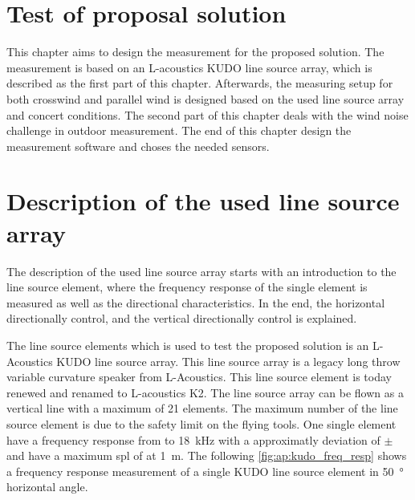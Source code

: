 \section{Test of proposal solution}
This chapter aims to design the measurement for the proposed solution. The measurement is based on an L-acoustics KUDO line source array, which is described as the first part of this chapter. Afterwards, the measuring setup for both crosswind and parallel wind is designed based on the used line source array and concert conditions. The second part of this chapter deals with the wind noise challenge in outdoor measurement. The end of this chapter design the measurement software and choses the needed sensors. 



\section{Description of the used line source array}\label{sec:prop:des_of_lin}

The description of the used line source array starts with an introduction to the line source element, where the frequency response of the single element is measured as well as the directional characteristics. In the end, the horizontal directionally control, and the vertical directionally control is explained.

The line source elements which is used to test the proposed solution is an L-Acoustics KUDO line source array. This line source array is a legacy long throw variable curvature speaker from L-Acoustics. This line source element is today renewed and renamed to L-acoustics K2. The line source array can be flown as a vertical line with a maximum of 21 elements. The maximum number of the line source element is due to the safety limit on the flying tools. 
One single element have a frequency response from  to \SI{18}{\kilo\hertz} with a approximatly deviation of $\pm$  and have a maximum \gls{spl} of  at \SI{1}{\meter}. The following \autoref{fig:ap:kudo_freq_resp} shows a frequency response measurement of a single KUDO line source element in \SI{50}{\degree} horizontal angle. 


